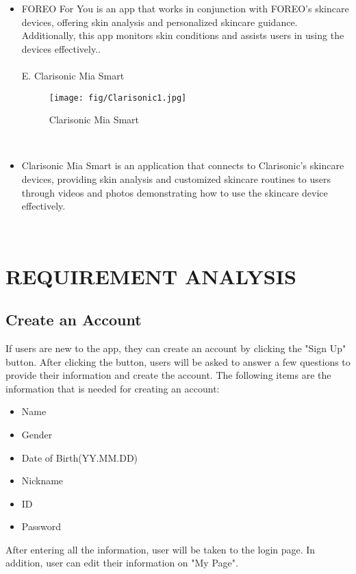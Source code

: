 \documentclass[conference]{IEEEtran}
\begin{document}
\begin{itemize}
\\
\item FOREO For You is an app that works in conjunction with FOREO's skincare devices, offering skin analysis and personalized skincare guidance. Additionally, this app monitors skin conditions and assists users in using the devices effectively..
\\
\\
E. Clarisonic Mia Smart
\begin{figure} [h]
    \texttt{[image: fig/Clarisonic1.jpg]}
    \caption{Clarisonic Mia Smart}
\end{figure}
\\
\item Clarisonic Mia Smart is an application that connects to Clarisonic's skincare devices, providing skin analysis and customized skincare routines to users through videos and photos demonstrating how to use the skincare device effectively.


\end{itemize}
\\

\section{REQUIREMENT ANALYSIS}

\subsection{Create an Account}
If users are new to the app, they can create an account by clicking the "Sign Up" button. After clicking the button, users will be asked to answer a few questions to provide their information and create the account. The following items are the information that is needed for creating an account:
\begin{itemize}
    \item Name
    \item Gender
    \item Date of Birth(YY.MM.DD)
    \item Nickname
    \item ID
    \item Password
\end{itemize}
After entering all the information, user will be taken to the login page. In addition, user can edit their information on "My Page".\\
\end{document}
